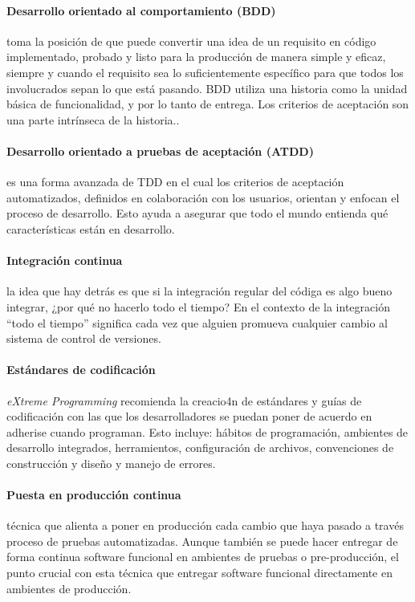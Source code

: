 \paragraph{Desarrollo orientado al comportamiento (BDD)} toma la posición de que puede convertir una idea de un requisito en código implementado, probado y listo para la producción de manera simple y eficaz, siempre y cuando el requisito sea lo suficientemente específico para que todos los involucrados sepan lo que está pasando. BDD utiliza una historia como la unidad básica de funcionalidad, y por lo tanto de entrega. Los criterios de aceptación son una parte intrínseca de la historia.\cite{michael-b}. 

\paragraph{Desarrollo orientado a pruebas de aceptación (ATDD)} es una forma avanzada de TDD en el cual los criterios de aceptación automatizados, definidos en colaboración con los usuarios, orientan y enfocan el proceso de desarrollo. Esto ayuda a asegurar que todo el mundo entienda qué características están en desarrollo.


\paragraph{Integración continua}  la idea que hay detrás es que si la integración regular del códiga es algo bueno integrar, ¿por qué no hacerlo todo el tiempo? En el contexto de la integración ``todo el tiempo'' significa cada vez que alguien promueva cualquier cambio al sistema de control de versiones\cite{humble}. 

\paragraph{Estándares de codificación} \emph{eXtreme Programming} recomienda la creacio4n de estándares y guías de codificación con las que los desarrolladores se puedan poner de acuerdo en adherise cuando programan\cite{shore-warden}. Esto incluye: hábitos de programación, ambientes de desarrollo integrados, herramientos, configuración de archivos, convenciones de construcción y diseño y manejo de errores.

\paragraph{Puesta en producción continua} técnica que alienta a poner en producción cada cambio que haya pasado a través proceso de pruebas automatizadas. Aunque también se puede hacer entregar de forma continua software funcional en ambientes de pruebas o pre-producción, el punto crucial con esta técnica que entregar software funcional directamente en ambientes de producción\cite{humble}.


